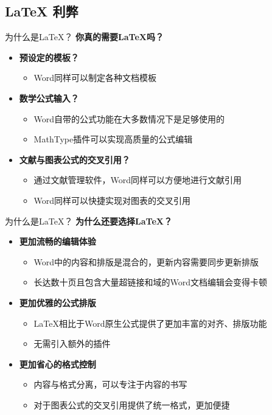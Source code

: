 \subsection{\LaTeX{} 利弊}

\begin{frame}[fragile]{为什么是\LaTeX{}？}
\textbf{你真的需要\LaTeX{}吗？}

\begin{itemize}
  \item \textbf{预设定的模板？}
  \begin{itemize}
    \item Word同样可以制定各种文档模板
  \end{itemize}
  \item \textbf{数学公式输入？}
  \begin{itemize}
    \item Word自带的公式功能在大多数情况下是足够使用的
    \item MathType插件可以实现高质量的公式编辑
  \end{itemize}
  \item \textbf{文献与图表公式的交叉引用？}
  \begin{itemize}
    \item 通过文献管理软件，Word同样可以方便地进行文献引用
    \item Word同样可以快捷实现对图表的交叉引用
  \end{itemize}
\end{itemize}

\end{frame}

\begin{frame}[fragile]{为什么是\LaTeX{}？}
  \textbf{为什么还要选择\LaTeX{}？}
  
  \begin{itemize}
    \item \textbf{更加流畅的编辑体验}
    \begin{itemize}
      \item Word中的内容和排版是混合的，更新内容需要同步更新排版
      \item 长达数十页且包含大量超链接和域的Word文档编辑会变得卡顿
    \end{itemize}
    \item \textbf{更加优雅的公式排版}
    \begin{itemize}
      \item \LaTeX{}相比于Word原生公式提供了更加丰富的对齐、排版功能
      \item 无需引入额外的插件
    \end{itemize}
    \item \textbf{更加省心的格式控制}
    \begin{itemize}
      \item 内容与格式分离，可以专注于内容的书写
      \item 对于图表公式的交叉引用提供了统一格式，更加便捷
    \end{itemize}
  \end{itemize}
  \end{frame}

